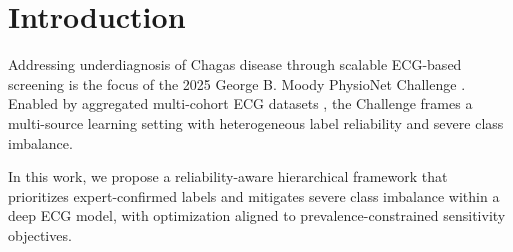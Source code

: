 \section{Introduction}
\label{sec:intro}


Addressing underdiagnosis of Chagas disease through scalable ECG-based screening is the focus of the 2025 George B. Moody PhysioNet Challenge \cite{goldberger2000physionet, cinc2025}. Enabled by aggregated multi-cohort ECG datasets \cite{ribeiro2020automatic, Cardoso_2016_Sami-Trop, wagner2020ptb_xl, Nunes_2021_Incidence, Filho_2020_Prognostic}, the Challenge frames a multi-source learning setting with heterogeneous label reliability and severe class imbalance.

In this work, we propose a reliability-aware hierarchical framework that prioritizes expert-confirmed labels and mitigates severe class imbalance within a deep ECG model, with optimization aligned to prevalence-constrained sensitivity objectives.
